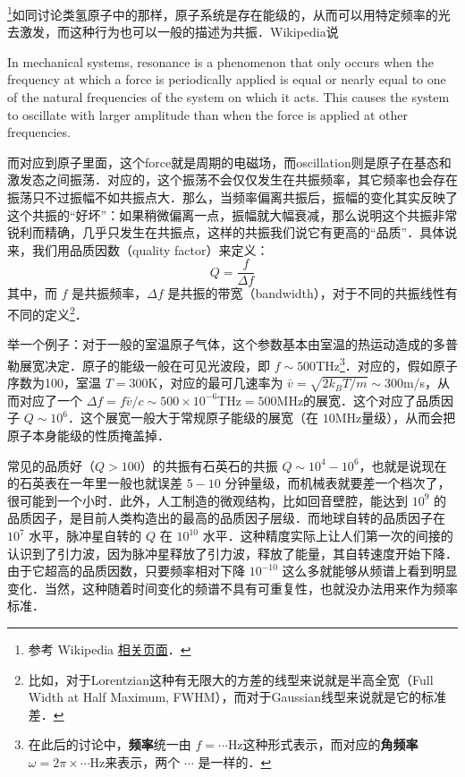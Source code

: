 


\begin{issues}
\issueMissDepend
\end{issues}


\footnote{参考 Wikipedia \href{https://en.wikipedia.org/wiki/Resonance}{相关页面}．}如同讨论类氢原子中的那样，原子系统是存在能级的，从而可以用特定频率的光去激发，而这种行为也可以一般的描述为共振．Wikipedia说

In mechanical systems, resonance is a phenomenon that only occurs when the frequency at which a force is periodically applied is equal or nearly equal to one of the natural frequencies of the system on which it acts. This causes the system to oscillate with larger amplitude than when the force is applied at other frequencies.

而对应到原子里面，这个force就是周期的电磁场，而oscillation则是原子在基态和激发态之间振荡．对应的，这个振荡不会仅仅发生在共振频率，其它频率也会存在振荡只不过振幅不如共振点大．那么，当频率偏离共振后，振幅的变化其实反映了这个共振的“好坏”：如果稍微偏离一点，振幅就大幅衰减，那么说明这个共振非常锐利而精确，几乎只发生在共振点，这样的共振我们说它有更高的“品质”．具体说来，我们用品质因数（quality factor）来定义：
\begin{equation}
Q = \frac{f}{\Delta f}
\end{equation}
其中，而 $f$ 是共振频率，$\Delta f$ 是共振的带宽（bandwidth），对于不同的共振线性有不同的定义\footnote{比如，对于Lorentzian这种有无限大的方差的线型来说就是半高全宽（Full Width at Half Maximum, FWHM），而对于Gaussian线型来说就是它的标准差．}．

举一个例子：对于一般的室温原子气体，这个参数基本由室温的热运动造成的多普勒展宽决定．原子的能级一般在可见光波段，即 $f\sim 500$THz\footnote{在此后的讨论中，\textbf{频率}统一由 $f=\cdots$Hz这种形式表示，而对应的\textbf{角频率}$\omega=2\pi\times\cdots$Hz来表示，两个 $\cdots$ 是一样的．}．对应的，假如原子序数为100，室温 $T=300$K，对应的最可几速率为 $\bar{v}=\sqrt{2k_BT/m}\sim300$m/s，从而对应了一个 $\Delta f=f\bar{v}/c\sim500\times10^{-6}$THz$=500$MHz的展宽．这个对应了品质因子 $Q\sim10^6$．这个展宽一般大于常规原子能级的展宽（在 $10$MHz量级），从而会把原子本身能级的性质掩盖掉．

常见的品质好（$Q>100$）的共振有石英石的共振 $Q\sim10^4-10^6$，也就是说现在的石英表在一年里一般也就误差 $5-10$ 分钟量级，而机械表就要差一个档次了，很可能到一个小时．此外，人工制造的微观结构，比如回音壁腔，能达到 $10^9$ 的品质因子，是目前人类构造出的最高的品质因子层级．而地球自转的品质因子在 $10^7$ 水平，脉冲星自转的 $Q$ 在 $10^{10}$ 水平．这种精度实际上让人们第一次的间接的认识到了引力波，因为脉冲星释放了引力波，释放了能量，其自转速度开始下降．由于它超高的品质因数，只要频率相对下降 $10^{-10}$ 这么多就能够从频谱上看到明显变化．当然，这种随着时间变化的频谱不具有可重复性，也就没办法用来作为频率标准．

